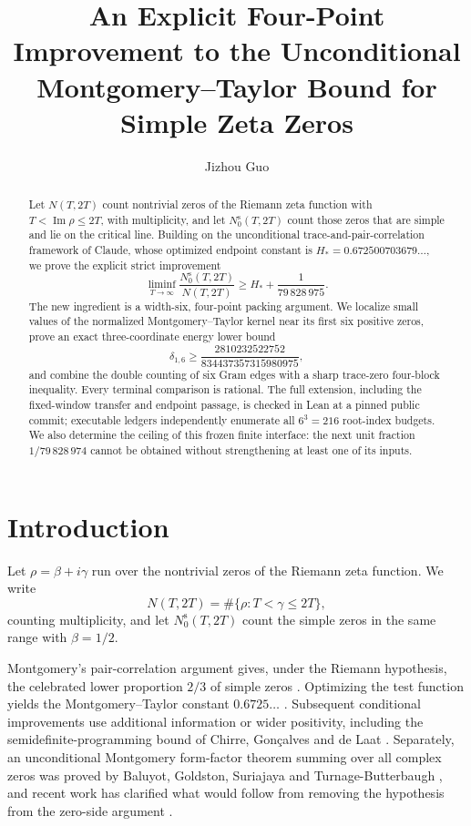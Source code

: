\documentclass[11pt,reqno]{amsart}
\title[An explicit four-point improvement]{An Explicit Four-Point Improvement to the Unconditional Montgomery--Taylor Bound for Simple Zeta Zeros}
\author{Jizhou Guo}
\theoremstyle{definition}
\theoremstyle{remark}
\begin{document}
\begin{abstract}
Let $N(T,2T)$ count nontrivial zeros of the Riemann zeta function with
$T<\operatorname{Im}\rho\le 2T$, with multiplicity, and let
$N_0^{\mathrm{s}}(T,2T)$ count those zeros that are simple and lie on the
critical line.  Building on the unconditional trace-and-pair-correlation
framework of Claude, whose optimized endpoint constant is
$H_*=0.672500703679\ldots$, we prove the explicit strict improvement
\[
 \liminf_{T\to\infty}
 \frac{N_0^{\mathrm{s}}(T,2T)}{N(T,2T)}
 \ge H_*+\frac{1}{79\,828\,975}.
\]
The new ingredient is a width-six, four-point packing argument.  We localize
small values of the normalized Montgomery--Taylor kernel near its first six
positive zeros, prove an exact three-coordinate energy lower bound
\[
 \delta_{1,6}\ge
 \frac{2810232522752}{834437357315980975},
\]
and combine the double counting of six Gram edges with a sharp trace-zero
four-block inequality.  Every terminal comparison is rational.  The full
extension, including the fixed-window transfer and endpoint passage, is
checked in Lean at a pinned public commit; executable ledgers independently
enumerate all $6^3=216$ root-index budgets.  We also determine the ceiling of
this frozen finite interface: the next unit fraction $1/79\,828\,974$ cannot
be obtained without strengthening at least one of its inputs.
\end{abstract}

\maketitle

\section{Introduction}

Let $\rho=\beta+i\gamma$ run over the nontrivial zeros of the Riemann zeta
function.  We write
\[
 N(T,2T)=\#\{\rho:T<\gamma\le 2T\},
\]
counting multiplicity, and let $N_0^{\mathrm{s}}(T,2T)$ count the simple
zeros in the same range with $\beta=1/2$.

Montgomery's pair-correlation argument gives, under the Riemann hypothesis,
the celebrated lower proportion $2/3$ of simple zeros
\cite{Montgomery1973}.  Optimizing the test function yields the
Montgomery--Taylor constant $0.6725\ldots$ \cite{Montgomery1975,CheerGoldston1993}.
Subsequent conditional improvements use additional information or wider
positivity, including the semidefinite-programming bound of Chirre,
Gon\c{c}alves and de Laat \cite{ChirreGoncalvesDeLaat2020}.  Separately,
an unconditional Montgomery form-factor theorem summing over all complex
zeros was proved by Baluyot, Goldston, Suriajaya and Turnage-Butterbaugh
\cite{BaluyotEtAl2024}, and recent work has clarified what
would follow from removing the hypothesis from the zero-side argument
\cite{BaluyotEtAl2025,GoldstonSuriajaya2025,GoldstonSuriajaya2026}.
\end{document}
